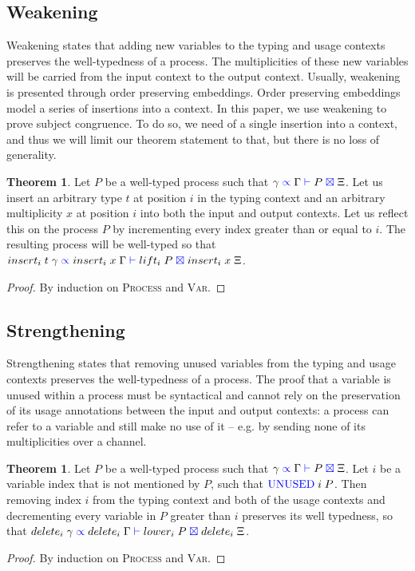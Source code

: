 \documentclass[a4paper,UKenglish,cleveref, autoref, thm-restate,authorcolumns]{lipics-v2019}
\theoremstyle{definition}
\newtheorem{nitheorem}[theorem]{Theorem}
\newcommand{\type}[1]{\textcolor{blue}{\operatorname{#1}}}
\newcommand{\types}[4]{#1 \; \type{\propto} \; #2 \; \type{\vdash} \; #3 \; \type{\boxtimes} \; #4}
\newcommand{\Unused}{\type{UNUSED}}
\begin{document}
\subsection{Weakening}

Weakening states that adding new variables to the typing and usage contexts preserves the well-typedness of a process.
The multiplicities of these new variables will be carried from the input context to the output context.
Usually, weakening is presented through order preserving embeddings.
Order preserving embeddings model a series of insertions into a context.
In this paper, we use weakening to prove subject congruence.
To do so, we need of a single insertion into a context, and thus we will limit our theorem statement to that, but there is no loss of generality.

\begin{nitheorem}
  Let $P$ be a well-typed process such that $\types{\gamma}{\Gamma}{P}{\Xi}$.
  Let us insert an arbitrary type $t$ at position $i$ in the typing context and an arbitrary multiplicity $x$ at position $i$ into both the input and output contexts.
  Let us reflect this on the process $P$ by incrementing every index greater than or equal to $i$.
  The resulting process will be well-typed so that $\types{insert_i \; t \; \gamma}{insert_i \; x \; \Gamma}{lift_i \; P}{insert_i \; x \; \Xi}$.
\end{nitheorem}
\begin{proof}
  By induction on \textsc{Process} and \textsc{Var}.
\end{proof}

\subsection{Strengthening}

Strengthening states that removing unused variables from the typing and usage contexts preserves the well-typedness of a process.
The proof that a variable is unused within a process must be syntactical and cannot rely on the preservation of its usage annotations between the input and output contexts: a process can refer to a variable and still make no use of it -- e.g. by sending none of its multiplicities over a channel.

\begin{nitheorem}
  Let $P$ be a well-typed process such that $\types{\gamma}{\Gamma}{P}{\Xi}$.
  Let $i$ be a variable index that is not mentioned by $P$, such that $\Unused \; i \; P$.
  Then removing index $i$ from the typing context and both of the usage contexts and decrementing every variable in $P$ greater than $i$ preserves its well typedness, so that $\types{delete_i \; \gamma}{delete_i \; \Gamma}{lower_i \; P}{delete_i \; \Xi}$.
\end{nitheorem}
\begin{proof}
  By induction on \textsc{Process} and \textsc{Var}.
\end{proof}
\end{document}
